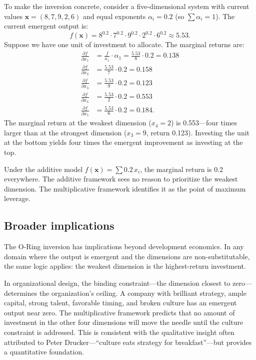 \documentclass[12pt, a4paper]{article}
\theoremstyle{definition}
\theoremstyle{remark}
\begin{document}
To make the inversion concrete, consider a five-dimensional system with current values $\mathbf{x} = (8, 7, 9, 2, 6)$ and equal exponents $\alpha_i = 0.2$ (so $\sum \alpha_i = 1$). The current emergent output is:
\[
f(\mathbf{x}) = 8^{0.2} \cdot 7^{0.2} \cdot 9^{0.2} \cdot 2^{0.2} \cdot 6^{0.2} \approx 5.53.
\]
Suppose we have one unit of investment to allocate. The marginal returns are:
\begin{align*}
\frac{\partial f}{\partial x_1} &= \frac{f}{x_1} \cdot \alpha_1 = \frac{5.53}{8} \cdot 0.2 = 0.138 \\
\frac{\partial f}{\partial x_2} &= \frac{5.53}{7} \cdot 0.2 = 0.158 \\
\frac{\partial f}{\partial x_3} &= \frac{5.53}{9} \cdot 0.2 = 0.123 \\
\frac{\partial f}{\partial x_4} &= \frac{5.53}{2} \cdot 0.2 = 0.553 \\
\frac{\partial f}{\partial x_5} &= \frac{5.53}{6} \cdot 0.2 = 0.184.
\end{align*}
The marginal return at the weakest dimension ($x_4 = 2$) is 0.553---four times larger than at the strongest dimension ($x_3 = 9$, return 0.123). Investing the unit at the bottom yields four times the emergent improvement as investing at the top.

Under the additive model $f(\mathbf{x}) = \sum 0.2 \, x_i$, the marginal return is 0.2 everywhere. The additive framework sees no reason to prioritize the weakest dimension. The multiplicative framework identifies it as the point of maximum leverage.

\subsection{Broader implications}

The O-Ring inversion has implications beyond development economics. In any domain where the output is emergent and the dimensions are non-substitutable, the same logic applies: the weakest dimension is the highest-return investment.

In organizational design, the binding constraint---the dimension closest to zero---determines the organization's ceiling. A company with brilliant strategy, ample capital, strong talent, favorable timing, and broken culture has an emergent output near zero. The multiplicative framework predicts that no amount of investment in the other four dimensions will move the needle until the culture constraint is addressed. This is consistent with the qualitative insight often attributed to Peter Drucker---``culture eats strategy for breakfast''---but provides a quantitative foundation.
\end{document}
